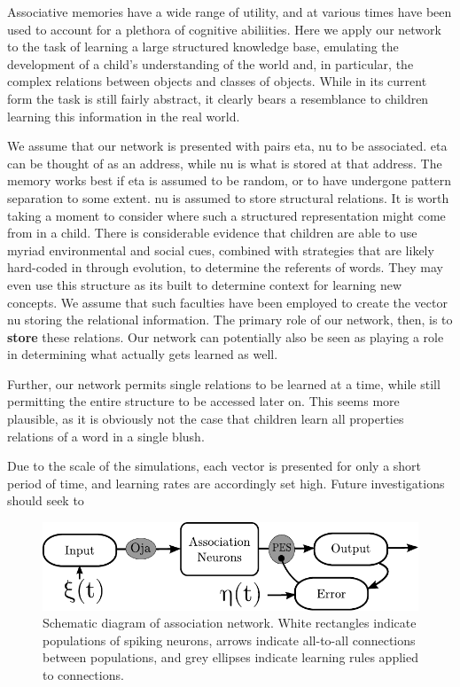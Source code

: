 \documentclass[10pt,letterpaper]{article}
\begin{document}
Associative memories have a wide range of utility, and at various times have been used to account for a plethora of cognitive abiliities. Here we apply our network to the task of learning a large structured knowledge base, emulating the development of a child's understanding of the world and, in particular, the complex relations between objects and classes of objects. While in its current form the task is still fairly abstract, it clearly bears a resemblance to children learning this information in the real world.

We assume that our network is presented with pairs eta, nu to be associated. eta can be thought of as an address, while nu is what is stored at that address. The memory works best if eta is assumed to be random, or to have undergone pattern separation to some extent. nu is assumed to store structural relations. It is worth taking a moment to consider where such a structured representation might come from in a child. There is considerable evidence that children are able to use myriad environmental and social cues, combined with strategies that are likely hard-coded in through evolution, to determine the referents of words. They may even use this structure as its built to determine context for learning new concepts. We assume that such faculties have been employed to create the vector nu storing the relational information. The primary role of our network, then, is to \textbf{store} these relations. Our network can potentially also be seen as playing a role in determining what actually gets learned as well. 

Further, our network permits single relations to be learned at a time, while still permitting the entire structure to be accessed later on. This seems more plausible, as it is obviously not the case that children learn all properties relations of a word in a single blush.

Due to the scale of the simulations, each vector is presented for only a short period of time, and learning rates are accordingly set high. Future investigations should seek to 


\begin{figure}[ht]
\includegraphics[width=\textwidth]{../diagrams/schematic.pdf}
\caption{Schematic diagram of association network. White rectangles indicate populations of spiking neurons, arrows indicate all-to-all connections between populations, and grey ellipses indicate learning rules applied to connections.}
\label{fig:schematic}
\end{figure}
\end{document}
